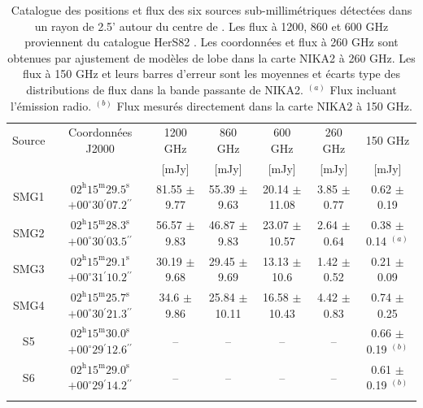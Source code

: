 \begin{table}[tp]
    \begin{center}
    \footnotesize
    \begin{tabular}{ccccccc}
        \toprule
        Source & Coordonnées J2000 & 1200 GHz & 860 GHz & 600 GHz & 260 GHz & 150 GHz \\
            &  & [mJy] & [mJy] & [mJy] & [mJy] & [mJy] \\
        \midrule
        SMG1 & $02^\mathrm{h}15^\mathrm{m}29.5^\mathrm{s}$ $+00^\circ30{}^\prime07.2{}^{\prime\prime}$ & 81.55 $\pm$ 9.77 & 55.39 $\pm$ 9.63 & 20.14 $\pm$ 11.08 & 3.85 $\pm$ 0.77 & 0.62 $\pm$ 0.19 \\
        SMG2 & $02^\mathrm{h}15^\mathrm{m}28.3^\mathrm{s}$ $+00^\circ30{}^\prime03.5{}^{\prime\prime}$ & 56.57 $\pm$ 9.83 & 46.87 $\pm$ 9.83 & 23.07 $\pm$ 10.57 & 2.64 $\pm$ 0.64 & 0.38 $\pm$ 0.14 $^{(a)}$\\
        SMG3 & $02^\mathrm{h}15^\mathrm{m}29.1^\mathrm{s}$ $+00^\circ31{}^\prime10.2{}^{\prime\prime}$ & 30.19 $\pm$ 9.68 & 29.45 $\pm$ 9.69 & 13.13 $\pm$ 10.6 & 1.42 $\pm$ 0.52 & 0.21 $\pm$ 0.09 \\
        SMG4 & $02^\mathrm{h}15^\mathrm{m}25.7^\mathrm{s}$ $+00^\circ30{}^\prime21.3{}^{\prime\prime}$ & 34.6 $\pm$ 9.86 & 25.84 $\pm$ 10.11 & 16.58 $\pm$ 10.43 & 4.42 $\pm$ 0.83 & 0.74 $\pm$ 0.25 \\
        S5 & $02^\mathrm{h}15^\mathrm{m}30.0^\mathrm{s}$ $+00^\circ29{}^\prime12.6{}^{\prime\prime}$ & -- & -- & -- & -- & 0.66 $\pm$ 0.19 $^{(b)}$\\
        S6 & $02^\mathrm{h}15^\mathrm{m}29.0^\mathrm{s}$ $+00^\circ29{}^\prime14.2{}^{\prime\prime}$ & -- & -- & -- & -- & 0.61 $\pm$ 0.19 $^{(b)}$\\
        \bottomrule\\
    \end{tabular}
    \normalsize
    \end{center}
    \vspace{-10pt}
    \caption{%
        Catalogue des positions et flux des six sources sub-millimétriques détectées dans un rayon de 2.5' autour du centre de \act.
        Les flux à 1200, 860 et 600 GHz proviennent du catalogue HerS82 \cite{viero_herschel_2014}.
        Les coordonnées et flux à 260 GHz sont obtenues par ajustement de modèles de lobe dans la carte NIKA2 à 260 GHz.
        Les flux à 150 GHz et leurs barres d'erreur sont les moyennes et écarts type des distributions de flux dans la bande passante de NIKA2.
        $^{(a)}$ Flux incluant l'émission radio.
        $^{(b)}$ Flux mesurés directement dans la carte NIKA2 à 150 GHz.
    }
    \label{tab:act:pscat}
\end{table}

